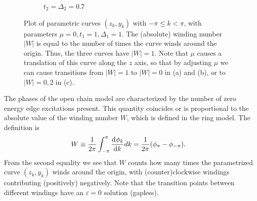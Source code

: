 \documentclass[a4paper]{article}
\newcommand{\en}{\varepsilon}
\begin{document}
\begin{figure}
\begin{subfigure}{0.32\textwidth}
		\caption{$t_2 = \Delta_2 = 0.7$}
		\label{sfig:curve_3}
	\end{subfigure}
	\caption{Plot of parametric curves $(z_k,y_k)$ with $-\pi \leq k < \pi$, with parameters $\mu = 0, t_1 = 1, \Delta_1 = 1$. The (absolute) winding number $|W|$ is equal to the number of times the curve winds around the origin. Thus, the three curves have $|W|=1$. Note that $\mu$ causes a translation of this curve along the $z$ axis, so that by adjusting $\mu$ we can cause transitions from $|W|=1$ to $|W|=0$ in (a) and (b), or to $|W|=0,2$ in (c).}
	\label{fig:curves}
\end{figure}

The phases of the open chain model are characterized by the number of zero energy edge excitations present. This quantity coincides or is proportional to the absolute value of the winding number $W$, which is defined in the ring model. The definition is
\begin{equation}
	W \equiv \frac{1}{2\pi} \int_{-\pi}^{\pi} \dv[]{\phi_k}{k} dk = \frac{1}{2\pi} (\phi_{\pi} - \phi_{-\pi}).
\end{equation}
From the second equality we see that $W$ counts how many times the parametrized curve $(z_k,y_k)$ winds around the origin, with (counter)clockwise windings contributing (positively) negatively. Note that the transition points between different windings have an $\en = 0$ solution (gapless).
\end{document}
